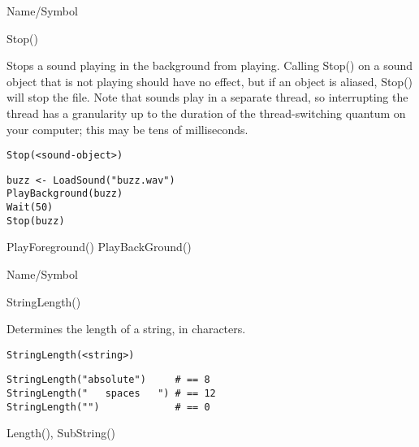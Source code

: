 \rl


\begin{desc}{Name/Symbol}
\item[Name/Symbol]  	Stop()	

\item[Description]  	Stops a sound playing in the background from playing.
		Calling Stop() on a sound object that is not playing should 
		have no effect, but if an object is aliased, Stop() will stop 
		the file.  Note that sounds play in a separate thread, so 
		interrupting the thread has a granularity up to the duration 
		of the thread-switching quantum on your computer; this may be 
		tens of milliseconds.

\item[Usage]
\begin{verbatim}
Stop(<sound-object>)
\end{verbatim}

\item[Example]     	
\begin{verbatim}
buzz <- LoadSound("buzz.wav")
PlayBackground(buzz)
Wait(50)
Stop(buzz)
\end{verbatim}

\item[See Also]    	PlayForeground() PlayBackGround()
\end{desc}

\rl


\begin{desc}{Name/Symbol}
\item[Name/Symbol]  	StringLength()

\item[Description] 	Determines the length of a string, in characters.

\item[Usage]
\begin{verbatim}
StringLength(<string>)
\end{verbatim}

\item[Example]     	
\begin{verbatim}
StringLength("absolute")     # == 8
StringLength("   spaces   ") # == 12
StringLength("")             # == 0
\end{verbatim}

\item[See Also]    	Length(), SubString()
\end{desc}

\rl


